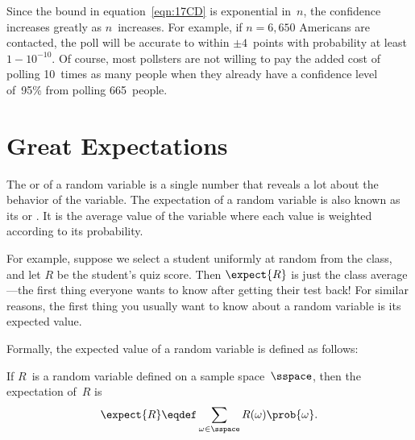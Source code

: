 \begin{editingnotes}
Since the bound in equation~\eqref{eqn:17CD} is exponential in~$n$, the
confidence increases greatly as $n$~increases.  For example, if $n =
6{,}650$ Americans are contacted, the poll will be accurate to within
$\pm 4$~points with probability at least~$1 - 10^{-10}$.  Of
course, most pollsters are not willing to pay the added cost of
polling 10~times as many people when they already have a confidence
level of~95\% from polling 665~people.

\end{editingnotes}

\begin{problems}
\practiceproblems
{}

\classproblems
{}

\homeworkproblems
{}
\end{problems}



\section{Great Expectations}\label{expectation_sec}

The  or  of a random variable
is a single number that reveals a lot about the behavior of the
variable.  The expectation of a random variable is also known as its
 or .  It is the average value of the
variable where each value is weighted according to its probability.

For example, suppose we select a student uniformly at random from the
class, and let $R$ be the student's quiz score.  Then  $\expect{R}$ is just the class average ---the first
thing everyone wants to know after getting their test back!  For similar
reasons, the first thing you usually want to know about a random variable
is its expected value.

Formally, the expected value of a random variable is defined as follows:
\begin{definition}\label{def:expectation}
If $R$~is a random variable defined on a sample space~$\sspace$, then
the expectation of~$R$ is
\begin{equation}\label{eqn:expectation}
    \expect{R} \eqdef \sum_{\omega \in \sspace} R(\omega) \prob{\omega}.
\end{equation}
\end{definition}

